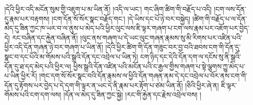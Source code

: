 །དེའི་ཕྱིར་འདི་མངོན་སུམ་གྱི་འཇུག་པ་མ་ཡིན་ནོ། །འདི་ལ་ཡང་། གང་ཞིག་ཚིག་གི་བརྗོད་པ་འདི། །ངག་ལས་དོན་དུ་རྣམ་པར་བརྟགས། །ངག་དོན་སོ་སོར་སྣང་བརྗོད་གང་། །དེ་ཡིས་དང་པོ་ཉེ་བར་བསྐྱེད། །ཚིག་གི་བརྗོད་པ་ལ་དོན་མེད་དུ་ཟིན་ཀྱང་ཁ་ཡར་བ་ལ་ནུས་པ་མེད་པའི་ཕྱིར་ལུང་ལས་ཇི་ལྟར་གཞག་པ་ངག་ལས་རྣམ་པར་འཇོག་པར་བྱེད་དེ། རང་བཞིན་དང་རྐྱེན་བཞིན་ནོ། །ལུང་ནས་གཞག་པ་དེ་ཡང་ལུང་གཞན་རྣམས་སུ་མི་རིགས་པར་འཛིན་པའི་ཕྱིར་འདི་དོན་གཞན་ཉེ་བར་གཞག་པ་ཡིན་ནོ། །དེའི་ཕྱིར་ཚིག་གི་དོན་གཟུང་བར་བྱ་བའི་ཐབས་ངག་གི་དོན་དུ་སྣང་བ་དང་པོའི་མ་གོམས་པའི་སྒྲའི་དོན་དང་འབྲེལ་པ་ཡིན་ཏེ། ངག་ཉིད་དང་དེའི་དོན་དག་ལ་དངོས་སུ་ནི་སྒྲའི་དོན་དུ་ཐ་དད་མེད་པའི་ཕྱིར་ལ། ཕྱིས་སྒྲའི་དོན་འཛིན་པའི་མངོན་པའི་ང་རྒྱལ་གྱིས་གཞག་པ་སྟེ་ལྕགས་ཀྱུ་མེད་པ་པ་ཡིན་ཕྱིར་རོ། །གང་དག་སོ་སོར་སྣང་བའི་དོན་རྣམས་ལ་ཕྱིའི་དོན་གཞན་ནམ་དེ་དང་འབྲེལ་པ་བོར་ནས་ངག་གི་དོན་དུ་རྟོགས་པར་བྱེད་པ་དེ་དག་གི་ལྟར་ན་ཡང་དེ་ནི་རྣམ་པར་རྟོག་པ་ཙམ་ཡིན་ནོ། །ཅིའི་ཕྱིར་ཞེ་ན། ཇི་ལྟར་གོམས་པའི་ངག་དག་ལས། །དོན་ལ་མེད་དུ་ཟིན་ཀྱང་སྐྱེ། །རང་གི་རྐྱེན་དང་རྗེས་འབྲེལ་བས། །
